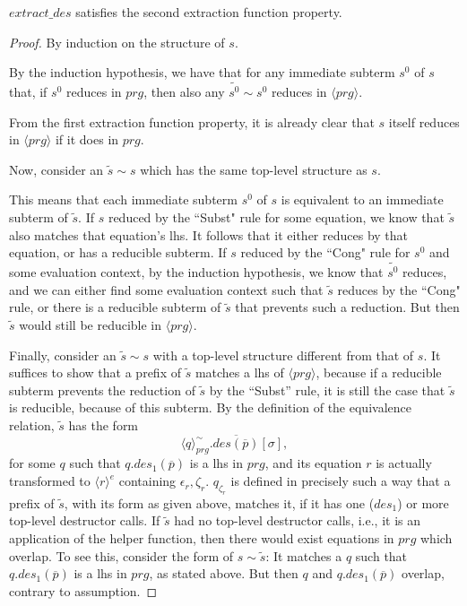 \begin{lemma}

$extract\_des$ satisfies the second extraction function property.

\begin{proof}

By induction on the structure of $s$.

By the induction hypothesis, we have that for any immediate subterm $s^0$ of $s$ that, if $s^0$ reduces in $prg$, then also any $\widetilde{s^0} \sim s^0$ reduces in $\langle prg \rangle$.

From the first extraction function property, it is already clear that $s$ itself reduces in $\langle prg \rangle$ if it does in $prg$.

Now, consider an $\widetilde{s} \sim s$ which has the same top-level structure as $s$.

This means that each immediate subterm $s^0$ of $s$ is equivalent to an immediate subterm of $\widetilde{s}$. If $s$ reduced by the ``Subst" rule for some equation, we know that $\widetilde{s}$ also matches that equation's lhs. It follows that it either reduces by that equation, or has a reducible subterm. If $s$ reduced by the ``Cong" rule for $s^0$ and some evaluation context, by the induction hypothesis, we know that $\widetilde{s^0}$ reduces, and we can either find some evaluation context such that $\widetilde{s}$ reduces by the ``Cong" rule, or there is a reducible subterm of $\widetilde{s}$ that prevents such a reduction. But then $\widetilde{s}$ would still be reducible in $\langle prg \rangle$.

Finally, consider an $\widetilde{s} \sim s$ with a top-level structure different from that of $s$. It suffices to show that a prefix of $\widetilde{s}$ matches a lhs of $\langle prg \rangle$, because if a reducible subterm prevents the reduction of $\widetilde{s}$ by the ``Subst'' rule, it is still the case that $\widetilde{s}$ is reducible, because of this subterm. By the definition of the equivalence relation, $\widetilde{s}$ has the form
\begin{equation*}
\langle q \rangle^{\sim}_{prg}.\overline{des(\overline{p})}[\sigma],
\end{equation*}
for some $q$ such that $q.des_1(\overline{p})$ is a lhs in $prg$, and its equation $r$ is actually transformed to $\langle r \rangle^e$ containing $\epsilon_r, \zeta_r$. $q_{\zeta_r}$ is defined in precisely such a way that a prefix of $\widetilde{s}$, with its form as given above, matches it, if it has one ($des_1$) or more top-level destructor calls. If $\widetilde{s}$ had no top-level destructor calls, i.e., it is an application of the helper function, then there would exist equations in $prg$ which overlap. To see this, consider the form of $s \sim \widetilde{s}$: It matches a $q$ such that $q.des_1(\overline{p})$ is a lhs in $prg$, as stated above. But then $q$ and $q.des_1(\overline{p})$ overlap, contrary to assumption.

\end{proof}

\end{lemma}

